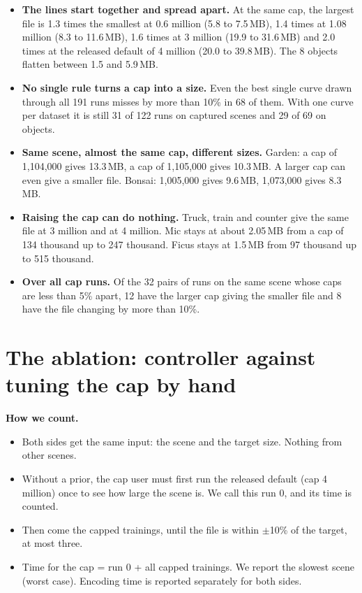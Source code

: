 \documentclass[10pt]{article}
\begin{document}
\begin{itemize}
\item \textbf{The lines start together and spread apart.} At the same cap, the largest file is 1.3 times the smallest at 0.6 million (5.8 to 7.5\,MB), 1.4 times at 1.08 million (8.3 to 11.6\,MB), 1.6 times at 3 million (19.9 to 31.6\,MB) and 2.0 times at the released default of 4 million (20.0 to 39.8\,MB). The 8 objects flatten between 1.5 and 5.9\,MB.
\item \textbf{No single rule turns a cap into a size.} Even the best single curve drawn through all 191 runs misses by more than 10\% in 68 of them. With one curve per dataset it is still 31 of 122 runs on captured scenes and 29 of 69 on objects.
\item \textbf{Same scene, almost the same cap, different sizes.} Garden: a cap of 1,104,000 gives 13.3\,MB, a cap of 1,105,000 gives 10.3\,MB. A larger cap can even give a smaller file. Bonsai: 1,005,000 gives 9.6\,MB, 1,073,000 gives 8.3\,MB.
\item \textbf{Raising the cap can do nothing.} Truck, train and counter give the same file at 3 million and at 4 million. Mic stays at about 2.05\,MB from a cap of 134 thousand up to 247 thousand. Ficus stays at 1.5\,MB from 97 thousand up to 515 thousand.
\item \textbf{Over all cap runs.} Of the 32 pairs of runs on the same scene whose caps are less than 5\% apart, 12 have the larger cap giving the smaller file and 8 have the file changing by more than 10\%.
\end{itemize}

\section{The ablation: controller against tuning the cap by hand}
\textbf{How we count.}
\begin{itemize}
\item Both sides get the same input: the scene and the target size. Nothing from other scenes.
\item Without a prior, the cap user must first run the released default (cap 4 million) once to see how large the scene is. We call this run 0, and its time is counted.
\item Then come the capped trainings, until the file is within $\pm$10\% of the target, at most three.
\item Time for the cap = run 0 + all capped trainings. We report the slowest scene (worst case). Encoding time is reported separately for both sides.
\end{itemize}
\end{document}
